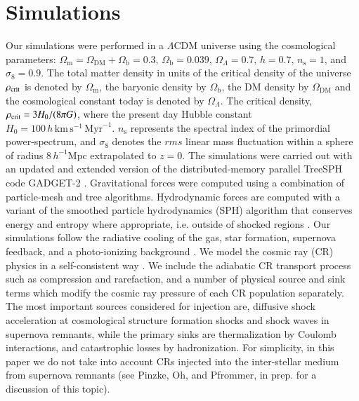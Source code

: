 \documentclass[useAMS,usenatbib]{mn2e}
\newcommand{\mr}{\mathrm}
\newcommand{\DM}{\mathrm{DM}}
\begin{document}
\section{Simulations}
\label{sect:simulations}
Our simulations were performed in a $\Lambda$CDM universe using the
cosmological parameters: $\Omega_{\mr m}=\Omega_\DM + \Omega_{\mr
  b}=0.3, \, \Omega_{\mr b}=0.039, \, \Omega_\Lambda=0.7, \, h=0.7, \,
n_{\mr s}=1$, and $\sigma_8=0.9$. The total matter density in units of
the critical density of the universe $\rho_{\rm crit}$ is denoted by
$\Omega_{\mr m}$, the baryonic density by $\Omega_{\mr b}$, the DM
density by $\Omega_\DM$ and the cosmological constant today is denoted
by $\Omega_\Lambda$. The critical density, $\rho_{\rm crit}=3H_0/(8\pi
G)$, where the present day Hubble constant $H_0=100\, h \, \mr{km}\,
\mr{s}^{-1} \, \mr{Myr}^{-1}$. $n_{\mr s}$ represents the spectral
index of the primordial power-spectrum, and $\sigma_8$ denotes the
$rms$ linear mass fluctuation within a sphere of radius $8 \,h^{-1}
\mr{Mpc}$ extrapolated to $z = 0$. The simulations were carried out
with an updated and extended version of the distributed-memory
parallel TreeSPH code GADGET-2 \citep{2005MNRAS.364.1105S,
  2001NewA....6...79S}. Gravitational forces were computed using a
combination of particle-mesh and tree algorithms.  Hydrodynamic forces
are computed with a variant of the smoothed particle hydrodynamics
(SPH) algorithm that conserves energy and entropy where appropriate,
i.e. outside of shocked regions \citep{2002MNRAS.333..649S}.  Our
simulations follow the radiative cooling of the gas, star formation,
supernova feedback, and a photo-ionizing background \citep[details can
  be found in][]{2007MNRAS.378..385P}. We model the cosmic ray (CR)
physics in a self-consistent way \citep{2006MNRAS.367..113P,
  2007A&A...473...41E, 2008A&A...481...33J}.  We include the adiabatic
CR transport process such as compression and rarefaction, and a number
of physical source and sink terms which modify the cosmic ray pressure
of each CR population separately. The most important sources
considered for injection are, diffusive shock acceleration at
cosmological structure formation shocks and shock waves in supernova
remnants, while the primary sinks are thermalization by Coulomb
interactions, and catastrophic losses by hadronization. For
simplicity, in this paper we do not take into account CRs injected
into the inter-stellar medium from supernova remnants (see Pinzke, Oh,
and Pfrommer, in prep. for a discussion of this topic).
\end{document}

